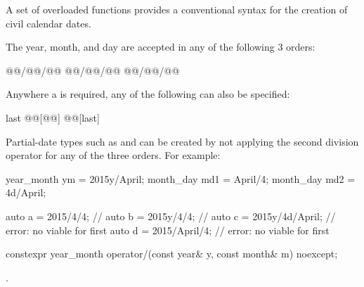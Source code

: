 \pnum
A set of overloaded  functions provides
a conventional syntax for the creation of civil calendar dates.

\pnum
\begin{note}
The year, month, and day are accepted in any of the following 3 orders:

\begin{codeblock}
@@/@@/@@
@@/@@/@@
@@/@@/@@
\end{codeblock}

Anywhere a  is required, any of the following can also be specified:

\begin{codeblock}
last
@@[@@]
@@[last]
\end{codeblock}
\end{note}

\pnum
\begin{note}
Partial-date types such as  and 
can be created by not applying the second division operator
for any of the three orders. For example:

\begin{codeblock}
year_month ym = 2015y/April;
month_day md1 = April/4;
month_day md2 = 4d/April;
\end{codeblock}
\end{note}

\pnum
\begin{example}
\begin{codeblock}
auto a = 2015/4/4;          // 
auto b = 2015y/4/4;         // 
auto c = 2015y/4d/April;    // error: no viable  for first \tcode{/}
auto d = 2015/April/4;      // error: no viable  for first \tcode{/}
\end{codeblock}
\end{example}

\begin{itemdecl}
constexpr year_month
  operator/(const year& y, const month& m) noexcept;
\end{itemdecl}

\begin{itemdescr}
\pnum
\returns
{}.
\end{itemdescr}

